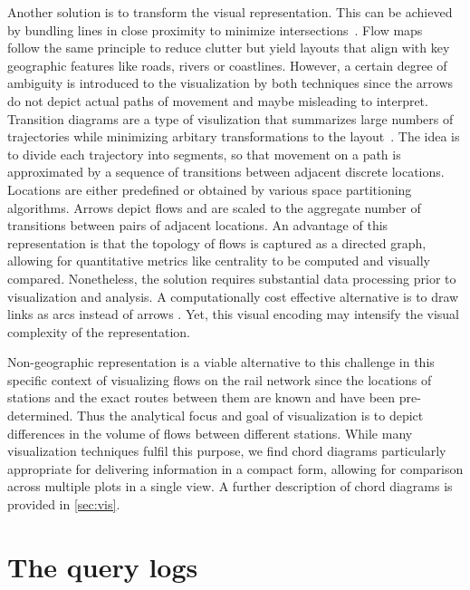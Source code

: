 \documentclass{sig-alternate}
\begin{document}
Another solution is to transform the visual representation. 
This can be achieved by bundling lines in close proximity to minimize intersections~\cite{hurter2014bundled}.
Flow maps~\cite{phan2005flow} follow the same principle to reduce clutter but yield layouts that align with key geographic features like roads, rivers or coastlines. 
However, a certain degree of ambiguity is introduced to the visualization by both techniques since the arrows do not depict actual paths of movement and maybe misleading to interpret.
Transition diagrams are a type of visulization that summarizes large numbers of trajectories while minimizing arbitary transformations to the layout~\cite{andrienko2012visual}. 
The idea is to divide each trajectory into segments, so that movement on a path is approximated by a sequence of transitions between adjacent discrete locations. 
Locations are either predefined or obtained by various space partitioning algorithms. 
Arrows depict flows and are scaled to the aggregate number of transitions between pairs of adjacent locations. 
An advantage of this representation is that the topology of flows is captured as a directed graph, allowing for quantitative metrics like centrality to be computed and visually compared. 
Nonetheless, the solution requires substantial data processing prior to visualization and analysis.
A computationally cost effective alternative is to draw links as arcs instead of arrows \cite{chua2014flowsampler}.
Yet, this visual encoding may intensify the visual complexity of the representation.

Non-geographic representation is a viable alternative to this challenge in this specific context of visualizing flows on the rail network since the locations of stations and the exact routes between them are known and have been pre-determined. 
Thus the analytical focus and goal of visualization is to depict differences in the volume of flows between different stations. 
While many visualization techniques fulfil this purpose, we find chord diagrams \cite{krzywinski2009circos} particularly appropriate for delivering information in a compact form, allowing for comparison across multiple plots in a single view.
A further description of chord diagrams is provided in \cref{sec:vis}.

\section{The query logs}
\label{sec:logs}
\end{document}

